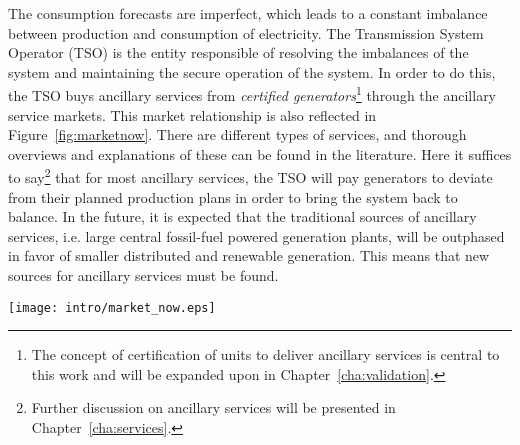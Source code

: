 The consumption forecasts are imperfect, which leads to a constant imbalance between production and consumption of electricity. The Transmission System Operator (TSO) is the entity responsible of resolving the imbalances of the system and maintaining the secure operation of the system. In order to do this, the TSO buys ancillary services from \emph{certified generators}\footnote{The concept of certification of units to deliver ancillary services is central to this work and will be expanded upon in Chapter~\ref{cha:validation}.}  through the ancillary service markets. This market relationship is also reflected in Figure~\ref{fig:marketnow}. There are different types of services, and thorough overviews and explanations of these can be found in the literature. Here it suffices to say\footnote{Further discussion on ancillary services will be presented in Chapter~\ref{cha:services}.} that for most ancillary services, the TSO will pay generators to deviate from their planned production plans in order to bring the system back to balance. In the future, it is expected that the traditional sources of ancillary services, i.e. large central fossil-fuel powered generation plants, will be outphased in favor of smaller distributed and renewable generation. This means that new sources for ancillary services must be found.
\begin{figure*}[hbp!]
		\centering
	\caption{The actors and relationships in the power market today. Note that the consumer buys electricity from a retailer, but has no further contact to the other market actors, i.e. the consumer has a passive role in the system.}\label{fig:marketnow}
	\texttt{[image: intro/market\_now.eps]}
\end{figure*}
